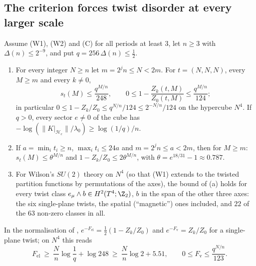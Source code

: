 \subsection{The criterion forces twist disorder at every larger scale}\label{subsec:T2}
\begin{theorem}\label{thm:twistall}
Assume (W1), (W2) and (C) for all periods at least $3$, let $n\ge3$ with $\Delta(n)\le2^{-9}$, and put $q=256\,\Delta(n)\le\frac12$.
\begin{enumerate}
\item[(a)] For every integer $N\ge n$ let $m=2^jn\le N<2m$. For $t=(N,N,N)$, every $M\ge m$ and every $k\ne0$,
\[
s_t(M)\le\frac{q^{M/n}}{248},\qquad 0\le1-\frac{Z_k(t,M)}{Z_0(t,M)}\le\frac{q^{M/n}}{124};
\]
in particular $0\le1-Z_k/Z_0\le q^{N/n}/124\le2^{-N/n}/124$ on the hypercube $N^4$. If $q>0$, every sector $e\ne0$ of the cube has $-\log(\|K|_{\mathcal H_e}\|/\lambda_0)\ge\log(1/q)/n$.
\item[(b)] If $a=\min_it_i\ge n$, $\max_it_i\le24a$ and $m=2^jn\le a<2m$, then for $M\ge m$: $s_t(M)\le\theta^{M/n}$ and $1-Z_k/Z_0\le2\theta^{M/n}$, with $\theta=e^{18/31}-1\approx0.787$.
\item[(c)] For Wilson's $SU(2)$ theory on $N^4$ (so that (W1) extends to the twisted partition functions by permutations of the axes), the bound of (a) holds for every twist class $e_\mu\wedge b\in H^2(T^4;\Z_2)$, $b$ in the span of the other three axes: the six single-plane twists, the spatial (``magnetic'') ones included, and $22$ of the $63$ non-zero classes in all.
\end{enumerate}
In the normalisation of \cite{TY85,KT02}, $e^{-F_{\mathrm{el}}}=\frac12(1-Z_k/Z_0)$ and $e^{-F_{\mathrm v}}=Z_k/Z_0$ for a single-plane twist; on $N^4$ this reads
\[
F_{\mathrm{el}}\ \ge\ \frac Nn\log\frac1q+\log248\ \ge\ \frac Nn\log2+5.51,\qquad 0\le F_{\mathrm v}\le\frac{q^{N/n}}{123}.
\]
\end{theorem}
